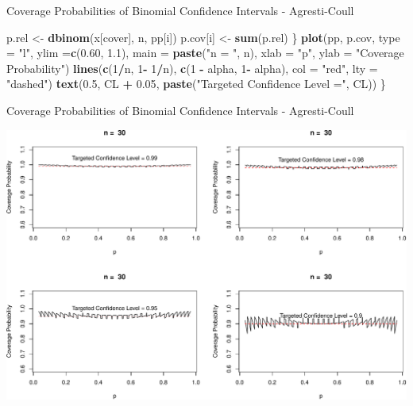 \documentclass[
  ignorenonframetext,
]{beamer}
\newenvironment{Shaded}{\begin{snugshade}}{\end{snugshade}}
\newcommand{\AttributeTok}[1]{\textcolor[rgb]{0.13,0.29,0.53}{#1}}
\newcommand{\DecValTok}[1]{\textcolor[rgb]{0.00,0.00,0.81}{#1}}
\newcommand{\FloatTok}[1]{\textcolor[rgb]{0.00,0.00,0.81}{#1}}
\newcommand{\FunctionTok}[1]{\textcolor[rgb]{0.13,0.29,0.53}{\textbf{#1}}}
\newcommand{\NormalTok}[1]{#1}
\newcommand{\OtherTok}[1]{\textcolor[rgb]{0.56,0.35,0.01}{#1}}
\newcommand{\SpecialCharTok}[1]{\textcolor[rgb]{0.81,0.36,0.00}{\textbf{#1}}}
\newcommand{\StringTok}[1]{\textcolor[rgb]{0.31,0.60,0.02}{#1}}
\begin{document}
\begin{frame}[fragile]{Coverage Probabilities of Binomial Confidence
Intervals - Agresti-Coull}
\begin{Shaded}
\begin{Highlighting}[]
\NormalTok{  p.rel }\OtherTok{\textless{}{-}} \FunctionTok{dbinom}\NormalTok{(x[cover], n, pp[i])}
\NormalTok{  p.cov[i] }\OtherTok{\textless{}{-}} \FunctionTok{sum}\NormalTok{(p.rel)}
\NormalTok{\}}
\FunctionTok{plot}\NormalTok{(pp, p.cov, }\AttributeTok{type =} \StringTok{"l"}\NormalTok{, }\AttributeTok{ylim =}\FunctionTok{c}\NormalTok{(}\FloatTok{0.60}\NormalTok{, }\FloatTok{1.1}\NormalTok{), }\AttributeTok{main =} \FunctionTok{paste}\NormalTok{(}\StringTok{"n = "}\NormalTok{, n), }
     \AttributeTok{xlab =} \StringTok{"p"}\NormalTok{, }\AttributeTok{ylab =} \StringTok{"Coverage Probability"}\NormalTok{)}
\FunctionTok{lines}\NormalTok{(}\FunctionTok{c}\NormalTok{(}\DecValTok{1}\SpecialCharTok{/}\NormalTok{n, }\DecValTok{1}\SpecialCharTok{{-}} \DecValTok{1}\SpecialCharTok{/}\NormalTok{n), }\FunctionTok{c}\NormalTok{(}\DecValTok{1} \SpecialCharTok{{-}}\NormalTok{ alpha, }\DecValTok{1}\SpecialCharTok{{-}}\NormalTok{ alpha), }\AttributeTok{col =} \StringTok{"red"}\NormalTok{, }\AttributeTok{lty =} \StringTok{"dashed"}\NormalTok{)}
      \FunctionTok{text}\NormalTok{(}\FloatTok{0.5}\NormalTok{, CL }\SpecialCharTok{+} \FloatTok{0.05}\NormalTok{, }\FunctionTok{paste}\NormalTok{(}\StringTok{"Targeted Confidence Level ="}\NormalTok{, CL))}
\NormalTok{\}}
\end{Highlighting}
\end{Shaded}

\normalsize
\end{frame}

\begin{frame}{Coverage Probabilities of Binomial Confidence Intervals -
Agresti-Coull}
\protect\hypertarget{coverage-probabilities-of-binomial-confidence-intervals---agresti-coull-1}{}
\tiny

\begin{center}\includegraphics[width=0.9\linewidth,height=0.8\textheight]{Week11_12_13_files/figure-beamer/unnamed-chunk-19-1} \end{center}
\normalsize
\end{frame}
\end{document}
